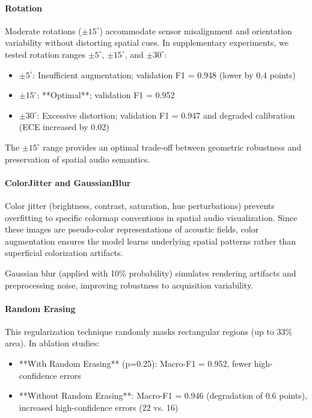 \documentclass[11pt,a4paper]{article}
\begin{document}
\paragraph{Rotation} Moderate rotations (\(\pm15^\circ\)) accommodate sensor misalignment and orientation variability without distorting spatial cues. In supplementary experiments, we tested rotation ranges \(\pm5^\circ\), \(\pm15^\circ\), and \(\pm30^\circ\):
\begin{itemize}[leftmargin=*]
\item \(\pm5^\circ\): Insufficient augmentation; validation F1 = 0.948 (lower by 0.4 points)
\item \(\pm15^\circ\): **Optimal**; validation F1 = 0.952
\item \(\pm30^\circ\): Excessive distortion; validation F1 = 0.947 and degraded calibration (ECE increased by 0.02)
\end{itemize}

The \(\pm15^\circ\) range provides an optimal trade-off between geometric robustness and preservation of spatial audio semantics.

\paragraph{ColorJitter and GaussianBlur} Color jitter (brightness, contrast, saturation, hue perturbations) prevents overfitting to specific colormap conventions in spatial audio visualization. Since these images are pseudo-color representations of acoustic fields, color augmentation ensures the model learns underlying spatial patterns rather than superficial colorization artifacts.

Gaussian blur (applied with 10\% probability) simulates rendering artifacts and preprocessing noise, improving robustness to acquisition variability.

\paragraph{Random Erasing} This regularization technique \cite{zhong2020randomerasing} randomly masks rectangular regions (up to 33\% area). In ablation studies:
\begin{itemize}[leftmargin=*]
\item **With Random Erasing** (p=0.25): Macro-F1 = 0.952, fewer high-confidence errors
\item **Without Random Erasing**: Macro-F1 = 0.946 (degradation of 0.6 points), increased high-confidence errors (22 vs. 16)
\end{itemize}
\end{document}
